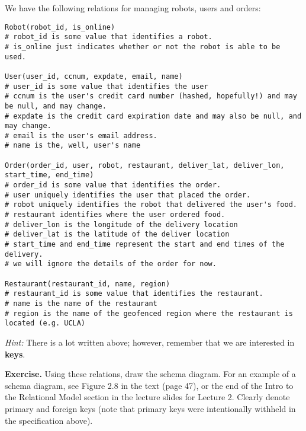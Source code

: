 \documentclass{report}
\renewcommand{\it}[1]{\textit{{#1}}}
\renewcommand{\bf}[1]{\textbf{{#1}}}
\begin{document}
\noindent We have the following relations for managing robots, users and orders:
\small{
\begin{verbatim}
Robot(robot_id, is_online)
# robot_id is some value that identifies a robot.
# is_online just indicates whether or not the robot is able to be used.

User(user_id, ccnum, expdate, email, name)
# user_id is some value that identifies the user
# ccnum is the user's credit card number (hashed, hopefully!) and may be null, and may change.
# expdate is the credit card expiration date and may also be null, and may change.
# email is the user's email address.
# name is the, well, user's name

Order(order_id, user, robot, restaurant, deliver_lat, deliver_lon, start_time, end_time)
# order_id is some value that identifies the order.
# user uniquely identifies the user that placed the order.
# robot uniquely identifies the robot that delivered the user's food.
# restaurant identifies where the user ordered food.
# deliver_lon is the longitude of the delivery location
# deliver_lat is the latitude of the deliver location
# start_time and end_time represent the start and end times of the delivery.
# we will ignore the details of the order for now.

Restaurant(restaurant_id, name, region)
# restaurant_id is some value that identifies the restaurant.
# name is the name of the restaurant
# region is the name of the geofenced region where the restaurant is located (e.g. UCLA)
\end{verbatim}
}
\noindent \it{Hint:} There is a lot written above; however, remember that we are interested in 
\bf{keys}. \vspace{10pt}

\noindent \bf{Exercise.} Using these relations, draw the schema diagram. For an example of a schema 
diagram, see Figure 2.8 in the text (page 47), or the end of the Intro to the Relational Model 
section in the lecture slides for Lecture 2. Clearly denote primary and foreign keys (note that 
primary keys were intentionally withheld in the specification above).
\end{document}
